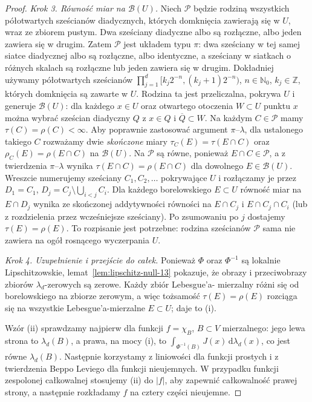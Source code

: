 \begin{proof}
\emph{Krok 3. Równość miar na $\mathcal B(U)$.}
Niech $\mathcal P$ będzie rodziną wszystkich półotwartych
sześcianów diadycznych, których domknięcia zawierają się
w $U$, wraz ze zbiorem pustym. Dwa sześciany diadyczne
albo są rozłączne, albo jeden zawiera się w drugim.
Zatem $\mathcal P$ jest układem typu $\pi$:
dwa sześciany w tej samej siatce diadycznej albo są
rozłączne, albo identyczne, a sześciany w siatkach
o różnych skalach są rozłączne lub jeden zawiera się
w drugim. Dokładniej używamy półotwartych sześcianów
$\prod_{j=1}^d[k_j2^{-n},(k_j+1)2^{-n})$,
$n\in\mathbb N_0$, $k_j\in\mathbb Z$, których domknięcia
są zawarte w $U$. Rodzina ta jest przeliczalna,
pokrywa $U$ i generuje
$\mathcal B(U)$: dla każdego $x\in U$ oraz otwartego
otoczenia $W\subset U$ punktu $x$ można wybrać
sześcian diadyczny $Q$ z $x\in Q$ i $\overline Q\subset W$.
Na każdym $C\in\mathcal P$ mamy
$\tau(C)=\rho(C)<\infty$. Aby poprawnie zastosować
argument $\pi$--$\lambda$, dla ustalonego takiego $C$
rozważamy dwie \emph{skończone} miary
$\tau_C(E)=\tau(E\cap C)$ oraz
$\rho_C(E)=\rho(E\cap C)$ na $\mathcal B(U)$.
Na $\mathcal P$ są równe, ponieważ $E\cap C\in\mathcal P$,
a z twierdzenia $\pi$--$\lambda$ wynika
$\tau(E\cap C)=\rho(E\cap C)$ dla dowolnego
$E\in\mathcal B(U)$. Wreszcie numerujemy sześciany
$C_1,C_2,\dots$ pokrywające $U$ i rozłączamy je przez
$D_1=C_1$, $D_j=C_j\setminus\bigcup_{i<j}C_i$.
Dla każdego borelowskiego $E\subset U$ równość miar
na $E\cap D_j$ wynika ze skończonej addytywności
równości na $E\cap C_j$ i $E\cap C_j\cap C_i$
(lub z rozdzielenia przez wcześniejsze sześciany).
Po zsumowaniu po $j$ dostajemy
$\tau(E)=\rho(E)$. To rozpisanie jest potrzebne:
rodzina sześcianów $\mathcal P$ sama nie zawiera
na ogół rosnącego wyczerpania $U$.

\emph{Krok 4. Uzupełnienie i przejście do całek.}
Ponieważ $\Phi$ oraz $\Phi^{-1}$ są lokalnie
Lipschitzowskie, lemat~\ref{lem:lipschitz-null-13}
pokazuje, że obrazy i przeciwobrazy zbiorów
$\lambda_d$-zerowych są zerowe. Każdy zbiór Lebesgue'a-
mierzalny różni się od borelowskiego na zbiorze zerowym,
a więc tożsamość $\tau(E)=\rho(E)$ rozciąga się na
wszystkie Lebesgue'a-mierzalne $E\subset U$; daje to (i).

Wzór (ii) sprawdzamy najpierw dla funkcji $f=\chi_B$,
$B\subset V$ mierzalnego: jego lewa strona to
$\lambda_d(B)$, a prawa, na mocy (i), to
$\int_{\Phi^{-1}(B)}J(x)\,\mathrm d\lambda_d(x)$,
co jest równe $\lambda_d(B)$.
Następnie korzystamy z liniowości dla funkcji prostych
i z twierdzenia Beppo Leviego dla funkcji nieujemnych.
W przypadku funkcji zespolonej całkowalnej stosujemy
(ii) do $|f|$, aby zapewnić całkowalność prawej strony,
a następnie rozkładamy $f$ na cztery części nieujemne.
\end{proof}

